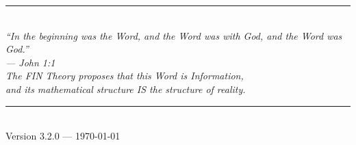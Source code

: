 \documentclass[11pt, a4paper]{article}
\theoremstyle{remark}
\begin{document}
\vspace{2cm}
\begin{center}
\rule{0.5\textwidth}{0.4pt}\\[0.5cm]
\textit{``In the beginning was the Word, and the Word was with God, and the Word was God.''}\\
\textit{--- John 1:1}\\[0.5cm]
\textit{The FIN Theory proposes that this Word is Information,}\\
\textit{and its mathematical structure IS the structure of reality.}\\[1cm]
\rule{0.5\textwidth}{0.4pt}\\[0.5cm]
Version 3.2.0 --- \today
\end{center}
\end{document}
